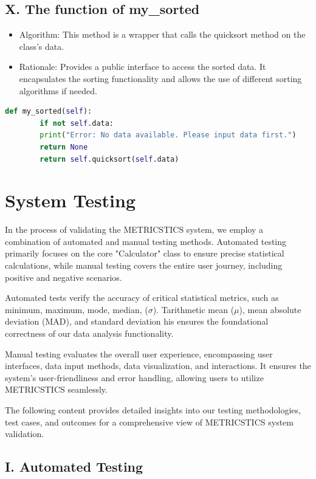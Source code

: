 \documentclass[english,12pt,a4paper]{report}
\begin{document}
	\subsection*{X. The function of my\_sorted}
	\begin{itemize}[leftmargin=*]
		\item Algorithm: This method is a wrapper that calls the quicksort method on the class's data.
		\item Rationale: Provides a public interface to access the sorted data. It encapsulates the sorting functionality and allows the use of different sorting algorithms if needed.
	\end{itemize}
	\begin{lstlisting}[language=Python, caption=My Sorted Method]
		def my_sorted(self):
		if not self.data:
		print("Error: No data available. Please input data first.")
		return None
		return self.quicksort(self.data)
	\end{lstlisting}
	
	
	\section{System Testing}
	
	\raggedright
	In the process of validating the METRICSTICS system, we employ a combination of automated and manual testing methods. Automated testing primarily focuses on the core "Calculator" class to ensure precise statistical calculations, while manual testing covers the entire user journey, including positive and negative scenarios.

	Automated tests verify the accuracy of critical statistical metrics, such as minimum, maximum, mode, median, ($\sigma$). Tarithmetic mean ($\mu$), mean absolute deviation (MAD), and standard deviation his ensures the foundational correctness of our data analysis functionality.
	
	Manual testing evaluates the overall user experience, encompassing user interfaces, data input methods, data visualization, and interactions. It ensures the system's user-friendliness and error handling, allowing users to utilize METRICSTICS seamlessly.
	
	The following content provides detailed insights into our testing methodologies, test cases, and outcomes for a comprehensive view of METRICSTICS system validation.
	
		\subsection*{I. Automated Testing}
		
\end{document}
